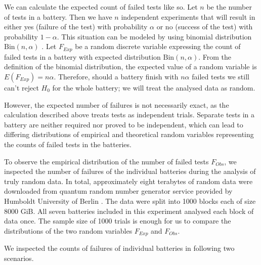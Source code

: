 \documentclass[
  digital,  	%
  color,		%
  oneside,   	%
  12pt,
  nocover,
  notable,
  nolof,
  nolot,
]{fithesis3}
\theoremstyle{definition}
\theoremstyle{remark}
\begin{document}
We can calculate the expected count of failed tests like so. Let $n$ be the number of tests in a battery. Then we have $n$ independent experiments that will result in either yes (failure of the test) with probability $\alpha$ or no (success of the test) with probability $1-\alpha$. This situation can be modeled by using binomial distribution $\text{Bin}(n, \alpha)$ \cite[p.~245]{stat-handbook}. Let $F_{Exp}$ be a random discrete variable expressing the count of failed tests in a battery with expected distribution $\text{Bin}(n, \alpha)$. From the definition of the binomial distribution, the expected value of a random variable is $E(F_{Exp}) = n\alpha$. Therefore, should a battery finish with $n\alpha$ failed tests we still can't reject $H_0$ for the whole battery; we will treat the analysed data as random.

However, the expected number of failures is not necessarily exact, as the calculation described above treats tests as independent trials. Separate tests in a battery are neither required nor proved to be independent, which can lead to differing distributions of empirical and theoretical random variables representing the counts of failed tests in the batteries.

To observe the empirical distribution of the number of failed tests $F_{Obs}$, we inspected the number of failures of the individual batteries during the analysis of truly random data. In total, approximately eight terabytes of random data were downloaded from quantum random number generator service provided by Humboldt University of Berlin \cite{qrng-service-germany}. The data were split into 1000 blocks each of size 8000 GiB. All seven batteries included in this experiment analysed each block of data once. The sample size of 1000 trials is enough for us to compare the distributions of the two random variables $F_{Exp}$ and $F_{Obs}$.

We inspected the counts of failures of individual batteries in following two scenarios.
\end{document}
